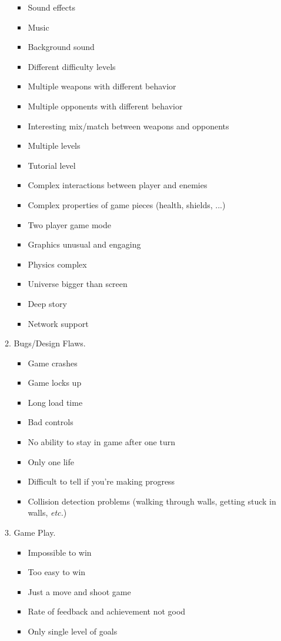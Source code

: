 \documentclass{article}
\begin{document}
\begin{enumerate}
\begin{multicols}{2}
\begin{enumerate}
\begin{itemize}
\item Sound effects
\item Music
\item Background sound
\item Different difficulty levels
\item Multiple weapons with different behavior
\item Multiple opponents with different behavior
\item Interesting mix/match between weapons and opponents
\item Multiple levels
\item Tutorial level
\item Complex interactions between player and
enemies
\item Complex properties of game pieces
(health, shields, ...)
\item Two player game mode
\item Graphics unusual and engaging
\item Physics complex
\item Universe bigger than screen
\item Deep story
\item Network support
\end{itemize}
\item Bugs/Design Flaws.
\begin{itemize}
\item Game crashes
\item Game locks up
\item Long load time
\item Bad controls
\item No ability to stay in game after one turn
\item Only one life
\item Difficult to tell if you’re making progress
\item Collision detection problems (walking
through walls, getting stuck in walls,
{\em etc.})
\end{itemize}
\item  Game Play. 
\begin{itemize}
\item Impossible to win
\item Too easy to win
\item Just a move and shoot game
\item Rate of feedback and achievement not
good
\item Only single level of goals

\end{itemize}
\end{enumerate}
\end{multicols}
\end{enumerate}
\end{document}
